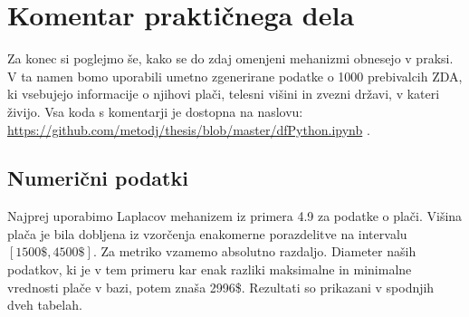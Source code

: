\documentclass[12pt,a4paper]{amsart}
\theoremstyle{definition} %
\theoremstyle{plain} %
\begin{document}
\section{Komentar praktičnega dela}

Za konec si poglejmo še, kako se do zdaj omenjeni mehanizmi obnesejo v praksi. V ta namen bomo uporabili umetno zgenerirane podatke o 1000 prebivalcih ZDA, ki vsebujejo informacije o njihovi plači, telesni višini in zvezni državi, v kateri živijo. Vsa koda s komentarji je dostopna na naslovu: \url{https://github.com/metodj/thesis/blob/master/dfPython.ipynb} .
\subsection{Numerični podatki}
Najprej uporabimo Laplacov mehanizem iz primera 4.9 za podatke o plači. Višina plača je bila dobljena iz vzorčenja enakomerne porazdelitve na intervalu $[1500\$,4500\$]$. Za metriko vzamemo absolutno razdaljo. Diameter naših podatkov, ki je v tem primeru kar enak razliki maksimalne in minimalne vrednosti plače v bazi, potem znaša 2996\$. Rezultati so prikazani v spodnjih dveh tabelah.
\end{document}
